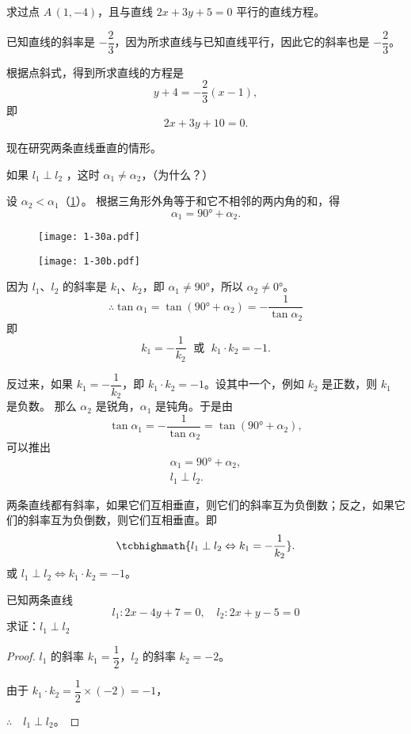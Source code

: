 \begin{example}
  求过点 $A\,(1,- 4)$，且与直线 $2x+3y+5=0$ 平行的直线方程。
\end{example}

\begin{solution}
已知直线的斜率是 $-\dfrac{2}{3}$，因为所求直线与已知直线平行，因此它的斜率也是 $-\dfrac{2}{3}$。

根据点斜式，得到所求直线的方程是
\[ y+4=-\frac{2}{3}(x-1),\]
即
\[ 2x+3y+10=0.\]
\end{solution}

现在研究两条直线垂直的情形。

如果 \(l_1 \perp l_2\) ，这时 $\alpha_1\neq\alpha_2$，（为什么？）

设 $\alpha_2<\alpha_1$（\cref{fig:1-30}）。
根据三角形外角等于和它不相邻的两内角的和，得
\[ \alpha_1=\ang{90}+\alpha_2. \]
\begin{figure}
  \begin{minipage}[b]{0.48\linewidth}\centering
  \texttt{[image: 1-30a.pdf]}
  \subcaption{}\label{fig:1-30a}
  \end{minipage}
  \begin{minipage}[b]{0.48\linewidth}\centering
  \texttt{[image: 1-30b.pdf]}
  \subcaption{}\label{fig:1-30b}
  \end{minipage}
  \caption{}\label{fig:1-30}
\end{figure}

因为 $l_1$、$l_2$ 的斜率是 $k_1$、$k_2$，即 $\alpha_1\neq\ang{90}$，所以 $\alpha_2\neq\ang{0}$。
\[ \therefore \tan\alpha_1 = \tan(\ang{90}+\alpha_2) = - \frac{1}{\tan\alpha_2} \]
即
\[
k_1=-\frac{1}{k_2}\;\text{ 或 }\;k_1 \cdot k_2 = -1.
\]

反过来，如果 $k_1=-\dfrac{1}{k_2}$，即 $k_1 \cdot k_2 = -1$。设其中一个，例如 $k_2$ 是正数，则 $k_1$ 是负数。
那么 $\alpha_2$ 是锐角，$\alpha_1$ 是钝角。于是由
\[ \tan\alpha_1 = - \frac{1}{\tan\alpha_2} = \tan(\ang{90}+\alpha_2), \]
可以推出
\begin{gather*}
  \alpha_1 = \ang{90} + \alpha_2,\\
l_1 \perp l_2.
\end{gather*}

两条直线都有斜率，如果它们互相垂直，则它们的斜率互为负倒数；反之，如果它们的斜率互为负倒数，则它们互相垂直。即
\[ \tcbhighmath{l_1 \perp l_2 \Leftrightarrow k_1=-\frac{1}{k_2}}. \]
或 $ l_1 \perp l_2 \Leftrightarrow k_1 \cdot k_2 = -1$。

\begin{example}
已知两条直线
\[l_1:2x-4y+7=0, \quad l_2:2x+y-5=0\]
求证：$l_1\perp l_2$
\end{example}
\begin{proof}
$l_1$ 的斜率 $k_1=\dfrac{1}{2}$，$l_2$ 的斜率 $k_2=-2$。

由于 $k_1\cdot k_2 =\dfrac{1}{2}\times(-2)=-1$，

$\therefore \quad l_1\perp l_2$。
\end{proof}


